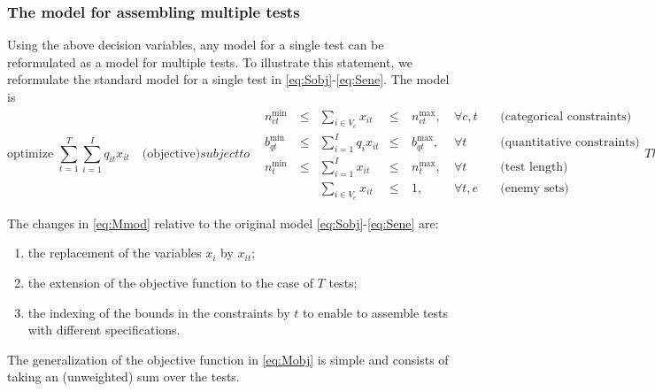 \subsubsection{The model for assembling multiple tests}
Using the above decision variables, any model for a single test can be reformulated as a model for multiple tests. To illustrate this statement, we reformulate the standard model for a single test in \eqref{eq:Sobj}-\eqref{eq:Sene}. The model is
\begin{subequations}\label{eq:Mmod}
	\begin{equation}\label{eq:Mobj}
	\mbox{optimize } \sum_{t=1}^T{\sum_{i=1}^I q_{it} x_{it}} \quad \mbox{(objective)}
	\end{equation}
	subject to    
	\begin{alignat}{4}
	\label{eq:Mcat}
	&n^{\min}_{ct} \ &\le & \sum_{i \in V_c} x_{it} &\le \ & n^{\max}_{ct}, \ &\forall c,t \quad & \mbox{(categorical constraints)}\\
	\label{eq:Mquan}
	&b^{\min}_{qt} \ &\le & \sum_{i=1}^I q_i x_{it} &\le \ & b^{\max}_{qt}, \ & \forall t \quad & \mbox{(quantitative constraints)}\\
	\label{eq:Mlen}
	&n^{\min}_t \ &\leq& \sum_{i=1}^I x_{it} &\le \ & n^{\max}_t, \  & \forall t \quad &\mbox{(test length)}\\
	\label{eq:Mene}
	&    & & \sum_{i \in V_e} x_{it}&\le \ & 1,   \  & \forall t,e \quad &\mbox{(enemy sets)}
	\end{alignat}
	Then, the definition of variables
	\begin{equation*}\label{eq:MDV2}
	x_{it} \in \{0,1\}, \ \forall i,t \quad \mbox{(decision variables)}
	\end{equation*}
\end{subequations}

The changes in \eqref{eq:Mmod} relative to the original model \eqref{eq:Sobj}-\eqref{eq:Sene} are:
\begin{enumerate}
	\item the replacement of the variables $x_i$ by $x_{it}$;
	\item the extension of the objective function to the case of $T$ tests;
	\item the indexing of the bounds in the constraints by $t$ to enable to assemble tests with different specifications.
\end{enumerate}

The generalization of the objective function in \eqref{eq:Mobj} is simple and consists of taking an (unweighted) sum over the tests.


